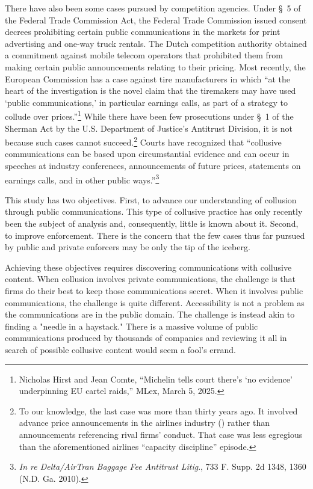 There have also been some cases pursued by competition agencies. Under
\S~5 of the Federal Trade Commission Act, the Federal Trade Commission
issued consent decrees prohibiting certain public communications in the
markets for print advertising and one-way truck rentals. The Dutch
competition authority obtained a commitment against mobile telecom
operators that prohibited them from making certain public announcements
relating to their pricing. Most recently, the European Commission has a
case against tire manufacturers in which ``at the heart of the
investigation is the novel claim that the tiremakers may have used `public
communications,' in particular earnings calls, as part of a strategy to
collude over prices.''\footnote{%
Nicholas Hirst and Jean Comte, ``Michelin tells court there's `no evidence'
underpinning EU cartel raids,'' MLex, March 5, 2025.} While there have been
few prosecutions under \S~1 of the Sherman Act by the U.S. Department of
Justice's Antitrust Division, it is not because such cases cannot
succeed.\footnote{%
To our knowledge, the last case was more than thirty years ago. It
involved advance price announcements in the airlines industry (\textcite{borenstein2004rapid}) rather than
announcements referencing rival firms' conduct. That case was less egregious than the aforementioned airlines
``capacity discipline'' episode.} Courts have recognized that ``collusive
communications can be based upon circumstantial evidence and can occur in
speeches at industry conferences, announcements of future prices,
statements on earnings calls, and in other public ways.''\footnote{\textit{In re Delta/AirTran Baggage Fee
Antitrust Litig}., 733 F. Supp. 2d 1348, 1360 (N.D. Ga. 2010).}

This study has two objectives. First, to advance our understanding of collusion through public communications. 
This type of collusive practice has only recently been the subject of analysis and, consequently, little is known about it. 
Second, to improve enforcement. There is the concern that the 
few cases thus far pursued by public and private enforcers may be only the tip of the iceberg. 

Achieving these objectives requires discovering communications with collusive content. When collusion involves private 
communications, the challenge is that firms do their best to keep those communications secret. When it 
involves public communications, the challenge is quite different. Accessibility is not a problem as the 
communications are in the public domain. The challenge is instead akin to finding a "needle in a haystack." 
There is a massive volume of public communications produced by thousands of companies and reviewing it all 
in search of possible collusive content would seem a fool's errand.

